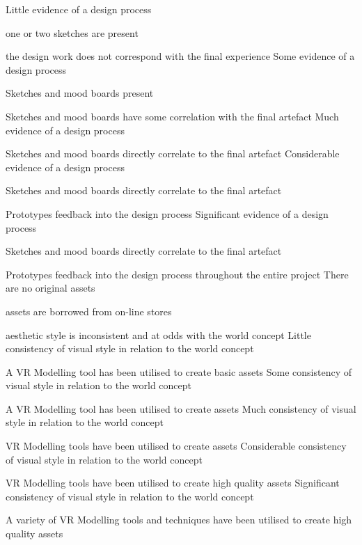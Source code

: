 \documentclass{../../fal_assignment}
\begin{document}
\begin{markingrubric}
        \grade Little evidence of a design process
            \par one or two sketches are present
            \par the design work does not correspond with the final experience
        \grade Some evidence of a design process
            \par Sketches and mood boards present
            \par Sketches and mood boards have some correlation with the final artefact
        \grade Much evidence of a design process
            \par Sketches and mood boards directly correlate to the final artefact
        \grade Considerable evidence of a design process
            \par Sketches and mood boards directly correlate to the final artefact
            \par Prototypes feedback into the design process
        \grade Significant evidence of a design process
            \par Sketches and mood boards directly correlate to the final artefact
            \par Prototypes feedback into the design process throughout the entire project
%
        \grade\fail There are no original assets
            \par assets are borrowed from on-line stores
            \par aesthetic style is inconsistent and at odds with the world concept
        \grade Little consistency of visual style in relation to the world concept
            \par A VR Modelling tool has been utilised to create basic assets 
        \grade Some consistency of visual style in relation to the world concept
            \par A VR Modelling tool has been utilised to create assets    
        \grade Much consistency of visual style in relation to the world concept
            \par VR Modelling tools have been utilised to create assets
        \grade Considerable consistency of visual style in relation to the world concept
            \par VR Modelling tools have been utilised to create high quality assets
        \grade Significant consistency of visual style in relation to the world concept
            \par A variety of VR Modelling tools and techniques have been utilised to create high quality assets    
        

\end{markingrubric}
\end{document}
